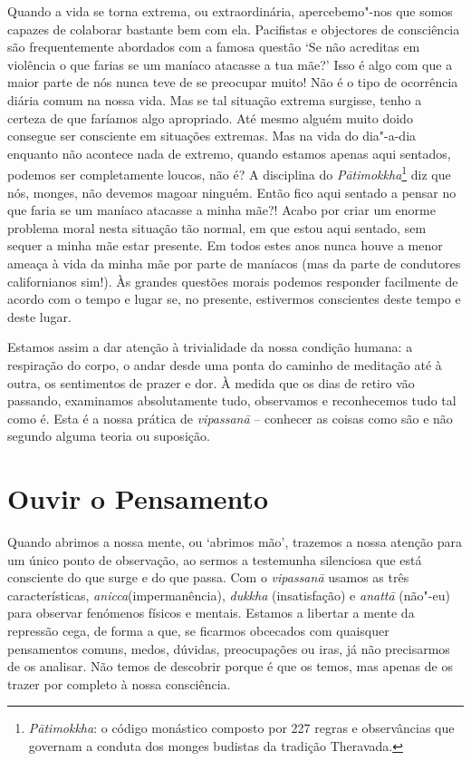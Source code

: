Quando a vida se torna extrema, ou extraordinária, apercebemo"-nos que
somos capazes de colaborar bastante bem com ela. Pacifistas e objectores
de consciência são frequentemente abordados com a famosa questão `Se
não acreditas em violência o que farias se um maníaco atacasse a tua
mãe?' Isso é algo com que a maior parte de nós nunca teve de se
preocupar muito! Não é o tipo de ocorrência diária comum na nossa vida.
Mas se tal situação extrema surgisse, tenho a certeza de que faríamos
algo apropriado. Até mesmo alguém muito doido consegue ser consciente em
situações extremas. Mas na vida do dia"-a-dia enquanto não acontece nada
de extremo, quando estamos apenas aqui sentados, podemos ser
completamente loucos, não é? A disciplina do \emph{Pātimokkha}\footnote{%
  \emph{Pātimokkha}: o código monástico composto por 227 regras e observâncias
  que governam a conduta dos monges budistas da tradição Theravada.}
diz que nós, monges, não devemos magoar ninguém. Então fico aqui sentado a
pensar no que faria se um maníaco atacasse a minha mãe?! Acabo por criar
um enorme problema moral nesta
situação tão normal, em que estou aqui sentado, sem sequer a minha mãe
estar presente. Em todos estes anos nunca houve a menor ameaça à vida da
minha mãe por parte de maníacos (mas da parte de condutores
californianos sim!). Às grandes questões morais podemos responder
facilmente de acordo com o tempo e lugar se, no presente, estivermos
conscientes deste tempo e deste lugar.

Estamos assim a dar atenção à trivialidade da nossa condição humana: a
respiração do corpo, o andar desde uma ponta do caminho de meditação até
à outra, os sentimentos de prazer e dor. À medida que os dias de retiro
vão passando, examinamos absolutamente tudo, observamos e reconhecemos
tudo tal como é. Esta é a nossa prática de \emph{vipassanā} -- conhecer
as coisas como são e não segundo alguma teoria ou suposição.

\chapter{Ouvir o Pensamento}

Quando abrimos a nossa mente, ou `abrimos mão', trazemos a nossa atenção
para um único ponto de observação, ao sermos a testemunha silenciosa que
está consciente do que surge e do que passa. Com o \emph{vipassanā}
usamos as três características, \emph{anicca}(impermanência), 
\emph{dukkha} (insatisfação) e \emph{anattā} (não"-eu) para observar 
fenómenos físicos e mentais. Estamos a libertar a mente da
repressão cega, de forma a que, se ficarmos obcecados com quaisquer
pensamentos comuns, medos, dúvidas, preocupações ou iras, já não
precisarmos de os analisar. Não temos de descobrir porque é que os
temos, mas apenas de os trazer por completo à nossa consciência.

